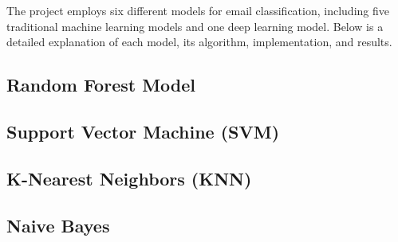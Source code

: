 The project employs six different models for email classification, including five traditional machine learning models and one deep learning model.
Below is a detailed explanation of each model, its algorithm, implementation, and results.

\subsection{Random Forest Model}
\label{subsec:random-forest-model}


\subsection{Support Vector Machine (SVM)}
\label{subsec:support-vector-machine}


\subsection{K-Nearest Neighbors (KNN)}
\label{subsec:k-nearest-neighbors}


\subsection{Naive Bayes}
\label{subsec:naive-bayes}
